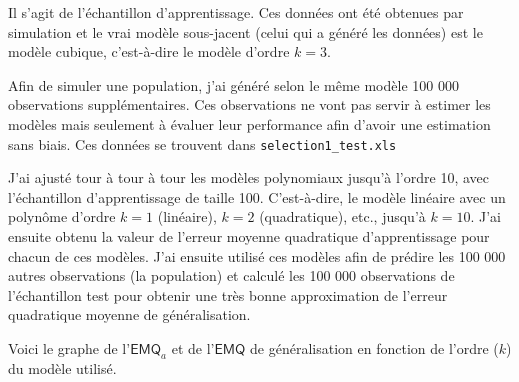 \documentclass[
]{book}
\theoremstyle{definition}
\theoremstyle{definition}
\theoremstyle{definition}
\theoremstyle{remark}
\begin{document}
Il s'agit de l'échantillon d'apprentissage. Ces données ont été obtenues par simulation et le vrai modèle sous-jacent (celui qui a généré les données) est le modèle cubique, c'est-à-dire le modèle d'ordre \(k=3\).

Afin de simuler une population, j'ai généré selon le même modèle 100 000 observations supplémentaires. Ces observations ne vont pas servir à estimer les modèles mais seulement à évaluer leur performance afin d'avoir une estimation sans biais. Ces données se trouvent dans \texttt{selection1\_test.xls}

J'ai ajusté tour à tour à tour les modèles polynomiaux jusqu'à l'ordre 10, avec l'échantillon d'apprentissage de taille 100. C'est-à-dire, le modèle linéaire avec un polynôme d'ordre \(k=1\) (linéaire), \(k=2\) (quadratique), etc., jusqu'à \(k=10\). J'ai ensuite obtenu la valeur de l'erreur moyenne quadratique d'apprentissage pour chacun de ces modèles. J'ai ensuite utilisé ces modèles afin de prédire les 100 000 autres observations (la population) et calculé les 100 000 observations de l'échantillon test pour obtenir une très bonne approximation de l'erreur quadratique moyenne de généralisation.

Voici le graphe de l'\(\mathsf{EMQ}_a\) et de l'\(\mathsf{EMQ}\) de généralisation en fonction de l'ordre (\(k\)) du modèle utilisé.
\end{document}
